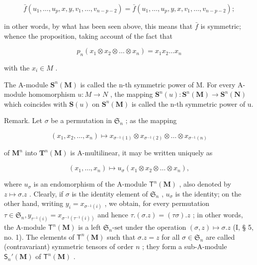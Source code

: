 \[
\bar {f} (u _ {1}, \dots , u _ {p}, x, y, v _ {1}, \dots , v _ {n - p - 2}) = \bar {f} (u _ {1}, \dots , u _ {p}, y, x, v _ {1}, \dots , v _ {n - p - 2});
\]

in other words, by what has been seen above, this means that \(\bar{f}\) is symmetric; whence the proposition, taking account of the fact that

\[
p _ {n} (x _ {1} \otimes x _ {2} \otimes \dots \otimes x _ {n}) = x _ {1} x _ {2} \dots x _ {n}
\]

with the \(x_{i} \in M\) .

The A-module \(\mathbf{S}^{n}(\mathbf{M})\) is called the n-th symmetric power of M. For every A-module homomorphism \(u: M \to N\) , the mapping \(\mathbf{S}^{n}(u): \mathbf{S}^{n}(\mathbf{M}) \to \mathbf{S}^{n}(\mathbf{N})\) which coincides with \(\mathbf{S}(u)\) on \(\mathbf{S}^{n}(\mathbf{M})\) is called the n-th symmetric power of u.

Remark. Let \(\sigma\) be a permutation in \(\mathfrak{S}_n\) ; as the mapping

\[
\left(x _ {1}, x _ {2}, \dots , x _ {n}\right) \mapsto x _ {\sigma^ {- 1} (1)} \otimes x _ {\sigma^ {- 1} (2)} \otimes \dots \otimes x _ {\sigma^ {- 1} (n)}
\]

of \(\mathbf{M}^n\) into \(\mathbf{T}^n (\mathbf{M})\) is A-multilinear, it may be written uniquely as

\[
(x _ {1}, \dots , x _ {n}) \mapsto u _ {\sigma} (x _ {1} \otimes x _ {2} \otimes \dots \otimes x _ {n}),
\]

where \(u_{\sigma}\) is an endomorphism of the A-module \(\mathsf{T}^n(\mathbf{M})\) , also denoted by \(z \mapsto \sigma. z\) . Clearly, if \(\sigma\) is the identity element of \(\mathfrak{S}_n\) , \(u_{\sigma}\) is the identity; on the other hand, writing \(y_i = x_{\sigma^{-1}(i)}\) , we obtain, for every permutation \(\tau \in \mathfrak{S}_n, y_{\tau^{-1}(i)} = x_{\sigma^{-1}(\tau^{-1}(i))}\) and hence \(\tau. (\sigma. z) = (\tau \sigma). z\) ; in other words, the A-module \(\mathsf{T}^n(\mathbf{M})\) is a left \(\mathfrak{S}_n\text{-set}\) under the operation \((\sigma, z) \mapsto \sigma. z\) (I, § 5, no. 1). The elements of \(\mathsf{T}^n(\mathbf{M})\) such that \(\sigma. z = z\) for all \(\sigma \in \mathfrak{S}_n\) are called (contravariant) symmetric tensors of order \(n\) ; they form a sub-A-module \(\mathsf{S}_n'(\mathbf{M})\) of \(\mathsf{T}^n(\mathbf{M})\) .

